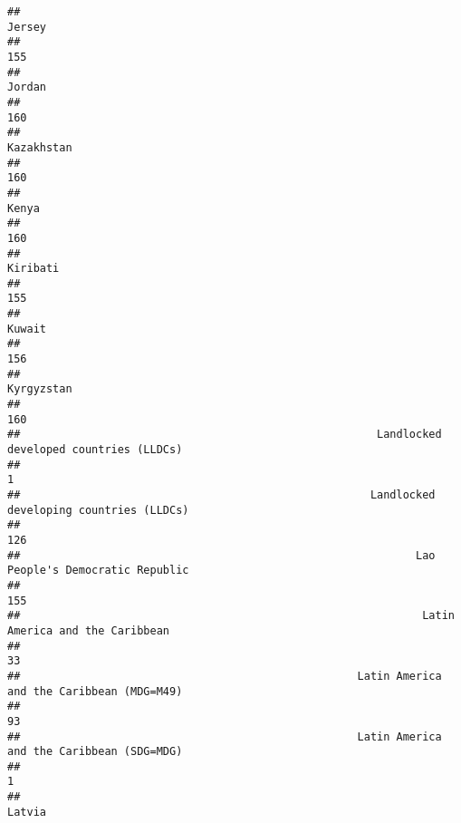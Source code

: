 \documentclass[]{article}
\begin{document}
\begin{verbatim}
##                                                                                       Jersey 
##                                                                                          155 
##                                                                                       Jordan 
##                                                                                          160 
##                                                                                   Kazakhstan 
##                                                                                          160 
##                                                                                        Kenya 
##                                                                                          160 
##                                                                                     Kiribati 
##                                                                                          155 
##                                                                                       Kuwait 
##                                                                                          156 
##                                                                                   Kyrgyzstan 
##                                                                                          160 
##                                                       Landlocked developed countries (LLDCs) 
##                                                                                            1 
##                                                      Landlocked developing countries (LLDCs) 
##                                                                                          126 
##                                                             Lao People's Democratic Republic 
##                                                                                          155 
##                                                              Latin America and the Caribbean 
##                                                                                           33 
##                                                    Latin America and the Caribbean (MDG=M49) 
##                                                                                           93 
##                                                    Latin America and the Caribbean (SDG=MDG) 
##                                                                                            1 
##                                                                                       Latvia 

\end{verbatim}
\end{document}
